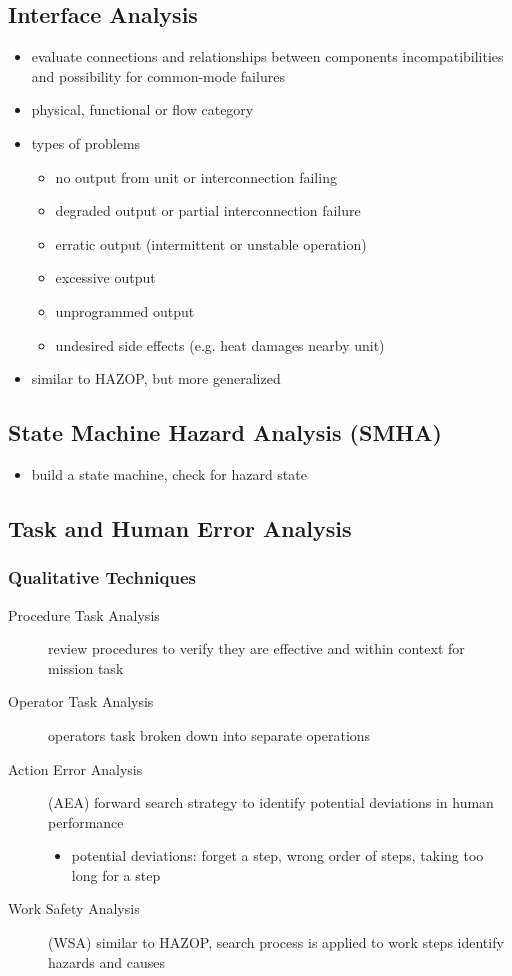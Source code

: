 \documentclass[a4paper, 10pt]{article}
\begin{document}
\subsection*{Interface Analysis}
\begin{itemize}
    \item evaluate connections and relationships between components \follows incompatibilities and possibility for common-mode failures
    \item physical, functional or flow category
    \item types of problems
    \begin{itemize}
        \item no output from unit or interconnection failing
        \item degraded output or partial interconnection failure
        \item erratic output (intermittent or unstable operation)
        \item excessive output
        \item unprogrammed output
        \item undesired side effects (e.g. heat damages nearby unit)
    \end{itemize}
    \item similar to HAZOP, but more generalized
\end{itemize}

\subsection*{State Machine Hazard Analysis (SMHA)}
\begin{itemize}
    \item build a state machine, check for hazard state
\end{itemize}

\subsection*{Task and Human Error Analysis}
\subsubsection*{Qualitative Techniques}
\begin{description}
    \item[Procedure Task Analysis] review procedures to verify they are effective and within context for mission task
    \item[Operator Task Analysis] operators task broken down into separate operations
    \item[Action Error Analysis] (AEA) forward search strategy to identify potential deviations in human performance
    \begin{itemize}
        \item potential deviations: forget a step, wrong order of steps, taking too long for a step
    \end{itemize}
    \item[Work Safety Analysis] (WSA) similar to HAZOP, search process is applied to work steps \follows identify hazards and causes
\end{description}
\end{document}
